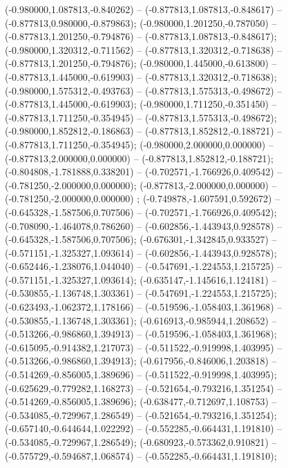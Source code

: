  (-0.980000,1.087813,-0.840262) -- (-0.877813,1.087813,-0.848617) -- (-0.877813,0.980000,-0.879863);
 (-0.980000,1.201250,-0.787050) -- (-0.877813,1.201250,-0.794876) -- (-0.877813,1.087813,-0.848617);
 (-0.980000,1.320312,-0.711562) -- (-0.877813,1.320312,-0.718638) -- (-0.877813,1.201250,-0.794876);
 (-0.980000,1.445000,-0.613800) -- (-0.877813,1.445000,-0.619903) -- (-0.877813,1.320312,-0.718638);
 (-0.980000,1.575312,-0.493763) -- (-0.877813,1.575313,-0.498672) -- (-0.877813,1.445000,-0.619903);
 (-0.980000,1.711250,-0.351450) -- (-0.877813,1.711250,-0.354945) -- (-0.877813,1.575313,-0.498672);
 (-0.980000,1.852812,-0.186863) -- (-0.877813,1.852812,-0.188721) -- (-0.877813,1.711250,-0.354945);
 (-0.980000,2.000000,0.000000) -- (-0.877813,2.000000,0.000000) -- (-0.877813,1.852812,-0.188721);
 (-0.804808,-1.781888,0.338201) -- (-0.702571,-1.766926,0.409542) -- (-0.781250,-2.000000,0.000000);
 (-0.877813,-2.000000,0.000000) -- (-0.781250,-2.000000,0.000000) ;
 (-0.749878,-1.607591,0.592672) -- (-0.645328,-1.587506,0.707506) -- (-0.702571,-1.766926,0.409542);
 (-0.708090,-1.464078,0.786260) -- (-0.602856,-1.443943,0.928578) -- (-0.645328,-1.587506,0.707506);
 (-0.676301,-1.342845,0.933527) -- (-0.571151,-1.325327,1.093614) -- (-0.602856,-1.443943,0.928578);
 (-0.652446,-1.238076,1.044040) -- (-0.547691,-1.224553,1.215725) -- (-0.571151,-1.325327,1.093614);
 (-0.635147,-1.145616,1.124181) -- (-0.530855,-1.136748,1.303361) -- (-0.547691,-1.224553,1.215725);
 (-0.623493,-1.062372,1.178166) -- (-0.519596,-1.058403,1.361968) -- (-0.530855,-1.136748,1.303361);
 (-0.616913,-0.985944,1.208652) -- (-0.513266,-0.986860,1.394913) -- (-0.519596,-1.058403,1.361968);
 (-0.615095,-0.914382,1.217073) -- (-0.511522,-0.919998,1.403995) -- (-0.513266,-0.986860,1.394913);
 (-0.617956,-0.846006,1.203818) -- (-0.514269,-0.856005,1.389696) -- (-0.511522,-0.919998,1.403995);
 (-0.625629,-0.779282,1.168273) -- (-0.521654,-0.793216,1.351254) -- (-0.514269,-0.856005,1.389696);
 (-0.638477,-0.712697,1.108753) -- (-0.534085,-0.729967,1.286549) -- (-0.521654,-0.793216,1.351254);
 (-0.657140,-0.644644,1.022292) -- (-0.552285,-0.664431,1.191810) -- (-0.534085,-0.729967,1.286549);
 (-0.680923,-0.573362,0.910821) -- (-0.575729,-0.594687,1.068574) -- (-0.552285,-0.664431,1.191810);
